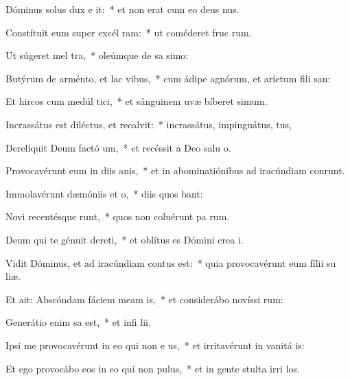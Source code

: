 \item Dóminus solus dux e it:~* et non erat cum eo deus nus.
\item Constítuit eum super excél ram:~* ut coméderet fruc rum.
\item Ut súgeret mel  tra,~* oleúmque de sa simo:
\item Butýrum de arménto, et lac  vibus,~* cum ádipe agnórum, et aríetum fili san:
\item Et hircos cum medúl tici,~* et sánguinem uvæ bíberet simum.
\item Incrassátus est diléctus, et recalvit:~* incrassátus, impinguátus, tus,
\item Derelíquit Deum factó um,~* et recéssit a Deo salu o.
\item Provocavérunt eum in diis anis,~* et in abominatiónibus ad iracúndiam conrunt.
\item Immolavérunt dæmóniis et  o,~* diis quos bant:
\item Novi recentésque runt,~* quos non coluérunt pa rum.
\item Deum qui te génuit dereti,~* et oblítus es Dómini crea i.
\item \singlecolsep
\item Vidit Dóminus, et ad iracúndiam contus est:~* quia provocavérunt eum fílii su  liæ.
\item Et ait: Abscóndam fáciem meam  is,~* et considerábo novíssi rum:
\item Generátio enim sa est,~* et infi lii.
\item Ipsi me provocavérunt in eo qui non e us,~* et irritavérunt in vanitá is:
\item Et ego provocábo eos in eo qui non  pulus,~* et in gente stulta irri los.
